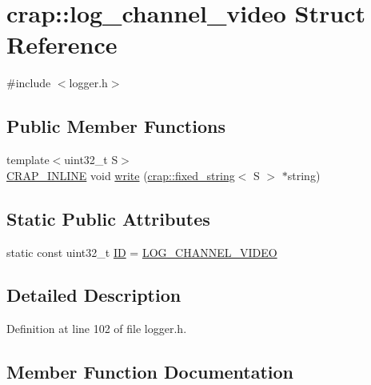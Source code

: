 \hypertarget{structcrap_1_1log__channel__video}{}\section{crap\+:\+:log\+\_\+channel\+\_\+video Struct Reference}
\label{structcrap_1_1log__channel__video}


{\ttfamily \#include $<$logger.\+h$>$}

\subsection*{Public Member Functions}
\begin{DoxyCompactItemize}
\item 
{\footnotesize template$<$uint32\+\_\+t S$>$ }\\\hyperlink{config__x86_8h_a5a40526b8d842e7ff731509998bb0f1c}{C\+R\+A\+P\+\_\+\+I\+N\+L\+I\+N\+E} void \hyperlink{structcrap_1_1log__channel__video_afd7f3f8cb6ee03908fbcbbc4ce5b9368}{write} (\hyperlink{classcrap_1_1fixed__string}{crap\+::fixed\+\_\+string}$<$ S $>$ $\ast$string)
\end{DoxyCompactItemize}
\subsection*{Static Public Attributes}
\begin{DoxyCompactItemize}
\item 
static const uint32\+\_\+t \hyperlink{structcrap_1_1log__channel__video_ac2a4ca99490b58e4b612084dbcafa122}{I\+D} = \hyperlink{logger_8h_a6dc128b9cc34ce68ba48b4a78f0e2407}{L\+O\+G\+\_\+\+C\+H\+A\+N\+N\+E\+L\+\_\+\+V\+I\+D\+E\+O}
\end{DoxyCompactItemize}


\subsection{Detailed Description}


Definition at line 102 of file logger.\+h.



\subsection{Member Function Documentation}
\hypertarget{structcrap_1_1log__channel__video_afd7f3f8cb6ee03908fbcbbc4ce5b9368}{}
